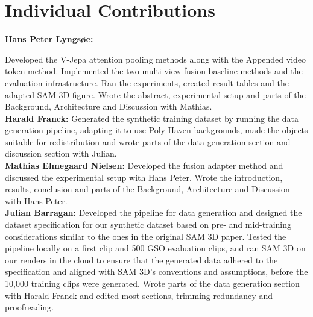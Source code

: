 \documentclass{article}
\begin{document}
\section{Individual Contributions}
\textbf{Hans Peter Lyngsøe:} 

Developed the V-Jepa attention pooling methods along with the Appended video token method. Implemented the two multi-view fusion baseline methods and the evaluation infrastructure. Ran the experiments, created result tables and the adapted SAM 3D figure. Wrote the abstract, experimental setup  and parts of the Background, Architecture and Discussion with Mathias. \\
\textbf{Harald Franck:} Generated the synthetic training dataset by running the data generation pipeline, adapting it to use Poly Haven backgrounds, made the objects suitable for redistribution and wrote parts of the data generation section and discussion section with Julian.\\
\textbf{Mathias Elmegaard Nielsen:} Developed the fusion adapter method and discussed the experimental setup with Hans Peter. Wrote the introduction, results, conclusion and parts of the Background, Architecture and Discussion with Hans Peter.\\
\textbf{Julian Barragan:} Developed the pipeline for data generation and designed the dataset specification for our synthetic dataset based on pre- and mid-training considerations similar to the ones in the original SAM 3D paper\cite{sam3d}. Tested the pipeline locally on a first clip and 500 GSO evaluation clips, and ran SAM 3D on our renders in the cloud to ensure that the generated data adhered to the specification and aligned with SAM 3D's conventions and assumptions, before the 10,000 training clips were generated. Wrote parts of the data generation section with Harald Franck and edited most sections, trimming redundancy and proofreading.
\end{document}
